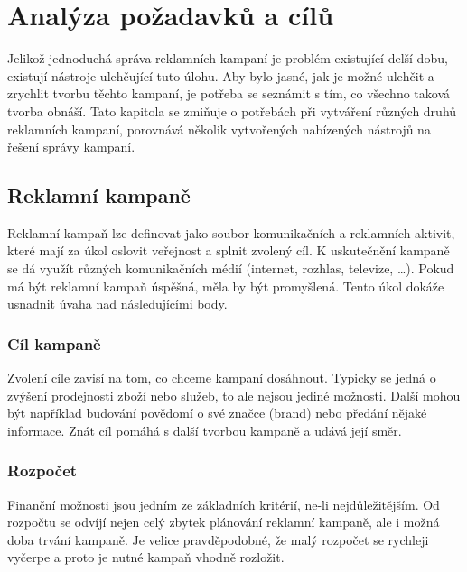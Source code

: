 \chapter{Analýza požadavků a cílů}
\label{chap:analysis}
Jelikož jednoduchá správa reklamních kampaní je problém existující delší dobu, existují nástroje ulehčující tuto úlohu. Aby bylo jasné, jak
je možné ulehčit a zrychlit tvorbu těchto kampaní, je potřeba se seznámit s tím, co všechno taková tvorba obnáší.
Tato kapitola se zmiňuje o potřebách při vytváření různých druhů reklamních kampaní, porovnává několik vytvořených nabízených
nástrojů na řešení správy kampaní.

\section{Reklamní kampaně}
Reklamní kampaň lze definovat jako soubor komunikačních a reklamních aktivit, které mají za úkol oslovit veřejnost a splnit zvolený cíl. K uskutečnění kampaně se dá využít různých komunikačních
médií (internet, rozhlas, televize, \ldots). Pokud má být reklamní kampaň úspěšná, měla by být promyšlená. Tento úkol dokáže usnadnit úvaha nad následujícími body.


\subsection{Cíl kampaně}
Zvolení cíle zavisí na tom, co chceme kampaní dosáhnout. Typicky se jedná o zvýšení prodejnosti zboží nebo služeb, to ale nejsou jediné možnosti. Další mohou být například budování
povědomí o své značce (brand) nebo předání nějaké informace. Znát cíl pomáhá s další tvorbou kampaně a udává její směr.

\subsection{Rozpočet}
Finanční možnosti jsou jedním ze základních kritérií, ne-li nejdůležitějším. Od rozpočtu se odvíjí nejen celý zbytek plánování reklamní kampaně, ale i možná
doba trvání kampaně. Je velice pravděpodobné, že malý rozpočet se rychleji vyčerpe a proto je nutné kampaň vhodně rozložit.


